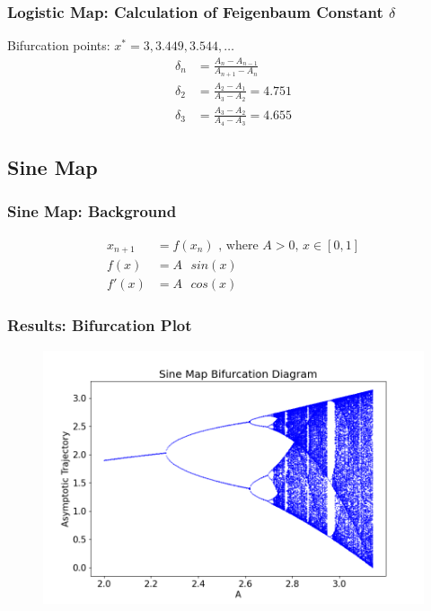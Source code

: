 \documentclass[
	11pt, %
	aspectratio=169, %
]{beamer}
\begin{document}

\begin{frame}
      \frametitle{Logistic Map: Calculation of Feigenbaum Constant $\delta$}
       Bifurcation points: $x^* = 3, 3.449, 3.544, \dots$ \pause
        \begin{align*}
            \delta_{n} &= \frac{A_{n}-A_{n-1}}{A_{n+1}-A_{n}} \\
            \delta_{2} &= \frac{A_{2}-A_{1}}{A_{3}-A_{2}} = 4.751 \\
            \delta_{3} &= \frac{A_{3}-A_{2}}{A_{4}-A_{3}} = 4.655
        \end{align*}
\end{frame}


\subsection{Sine Map}

\begin{frame}
        \frametitle{Sine Map: Background}
        \begin{align*}
            x_{n+1} &= f(x_n) \text{ , where $A > 0$, $x \in [0,1]$} \\
            f(x) &= A\text{ }sin(x) \\
            f'(x) &= A\text{ }cos(x)
        \end{align*}
\end{frame}


\begin{frame}
        \frametitle{Results: Bifurcation Plot}
    \begin{figure}
        \includegraphics[width=0.6\linewidth]
        {sine_bifurcation_diagram.png}
    \end{figure}
\end{frame}
\end{document}
